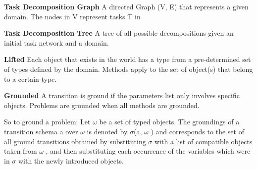 \textbf{Task Decomposition Graph}
A directed Graph (V, E) that represents a given domain. The nodes in V represent tasks T in

\textbf{Task Decomposition Tree}
A tree of all possible decompositions given an initial task network and a domain.


\textbf{Lifted}
Each object that exists in the world has a type from a pre-determined set of types defined by the domain.
Methods apply to the set of object(s) that belong to a certain type.

\textbf{Grounded}
A transition is ground if the parameters list only involves specific objects. 
Problems are grounded when all methods are grounded.

So to ground a problem: Let $\omega$ be a set of typed objects. The groundings of
a transition schema a over $\omega$  is denoted by $\sigma$(a, $\omega$ ) and corresponds to the set of all ground transitions obtained by
substituting $\sigma$ with a list of compatible objects taken from $\omega$ , and then substituting each occurrence of the variables
which were in $\sigma$ with the newly introduced objects.  

